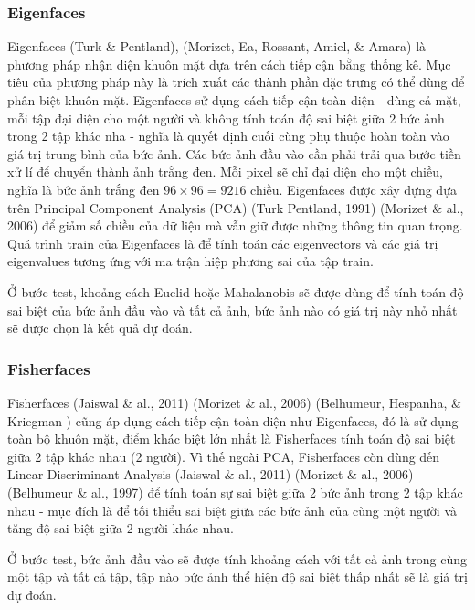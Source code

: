\documentclass[a4paper]{report}
\begin{document}
\subsubsection{Eigenfaces}
Eigenfaces (Turk \& Pentland\cite{eigenface1}), (Morizet, Ea, Rossant, Amiel, \& Amara\cite{eigenface2}) là phương pháp nhận diện khuôn mặt dựa trên cách tiếp cận bằng thống kê. Mục tiêu của phương pháp này là trích xuất các thành phần đặc trưng có thể dùng để phân biệt khuôn mặt. Eigenfaces sử dụng cách tiếp cận toàn diện - dùng cả mặt, mỗi tập đại diện cho một người và không tính toán độ sai biệt giữa 2 bức ảnh trong 2 tập khác nha - nghĩa là quyết định cuối cùng phụ thuộc hoàn toàn vào giá trị trung bình của bức ảnh. Các bức ảnh đầu vào cần phải trải qua bước tiền xử lí để chuyển thành ảnh trắng đen. Mỗi pixel sẽ chỉ đại diện cho một chiều, nghĩa là bức ảnh trắng đen $96\times 96 =9216$ chiều. Eigenfaces được xây dựng dựa trên Principal Component Analysis (PCA) (Turk Pentland, 1991) (Morizet \& al., 2006) để giảm số chiều của dữ liệu mà vẫn giữ được những thông tin quan trọng. Quá trình train của Eigenfaces là để tính toán các eigenvectors và các giá trị eigenvalues tương ứng với ma trận hiệp phương sai của tập train.
\par\noindent
Ở bước test, khoảng cách Euclid hoặc Mahalanobis sẽ được dùng để tính toán độ sai biệt của bức ảnh đầu vào và tất cả ảnh, bức ảnh nào có giá trị này nhỏ nhất sẽ được chọn là kết quả dự đoán. 
\subsubsection{Fisherfaces}
Fisherfaces (Jaiswal \& al., 2011) (Morizet \& al., 2006) (Belhumeur, Hespanha, \& Kriegman \cite{fisherface1}) cũng áp dụng cách tiếp cận toàn diện như Eigenfaces, đó là sử dụng toàn bộ khuôn mặt, điểm khác biệt lớn nhất là Fisherfaces tính toán độ sai biệt giữa 2 tập khác nhau (2 người). Vì thế ngoài PCA, Fisherfaces còn dùng đến Linear Discriminant Analysis (Jaiswal \& al., 2011) (Morizet \& al., 2006) (Belhumeur \& al., 1997) để tính toán sự sai biệt giữa 2 bức ảnh trong 2 tập khác nhau - mục đích là để tối thiểu sai biệt giữa các bức ảnh của cùng một người và tăng độ sai biệt giữa 2 người khác nhau.
\par\noindent
Ở bước test, bức ảnh đầu vào sẽ được tính khoảng cách với tất cả ảnh trong cùng một tập và tất cả tập, tập nào bức ảnh thể hiện độ sai biệt thấp nhất sẽ là giá trị dự đoán.
\end{document}
